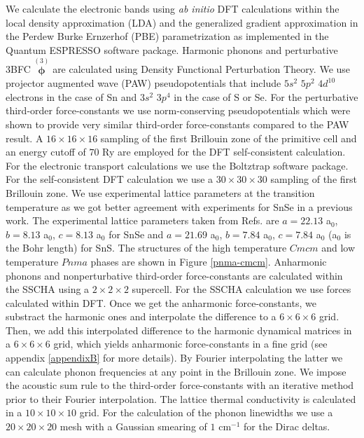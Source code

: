 We calculate the electronic bands using {\it ab initio} DFT calculations within the local density approximation (LDA)\cite{perdew1981self} and the generalized gradient approximation in the Perdew Burke
Ernzerhof (PBE) parametrization\cite{perdew1996generalized} as implemented in the {\sc Quantum ESPRESSO}\cite{giannozzi2009quantum} software package. Harmonic phonons and perturbative 3BFC $\overset{(3)}{\boldsymbol{\phi}}$ 
are calculated  using Density Functional Perturbation Theory\cite{baroni2001phonons,paulatto2013anharmonic}. We use projector augmented wave\cite{blochl1994projector} (PAW) pseudopotentials that 
include $5s^{2}$ $5p^{2}$ $4d^{10}$ electrons in the case of Sn and $3s^{2}$ $3p^{4}$ in the case of S or Se. For the perturbative third-order force-constants we use norm-conserving pseudopotentials which were 
shown\cite{aseginolaza2019phonon} to provide very similar third-order force-constants compared to the PAW result. A $16\times16\times16$ sampling of the first Brillouin zone of the primitive cell and an energy
cutoff of $70$ Ry are employed for the DFT self-consistent calculation. For the electronic transport calculations we use the Boltztrap software package\cite{madsen2006boltztrap}. For the self-consistent DFT calculation we 
use a $30\times30\times30$ sampling of the first Brillouin zone. We use experimental lattice parameters at the transition temperature as we got better agreement with experiments for SnSe in a previous
work\cite{aseginolaza2019phonon}. The experimental lattice parameters taken from Refs.\cite{adouby1998structure,chattopadhyay1986neutron} are $a=22.13$ a$_{0}$, $b=8.13$ a$_{0}$, $c=8.13$ a$_{0}$ for SnSe
and $a=21.69$ a$_{0}$, $b=7.84$ a$_{0}$, $c=7.84$ a$_{0}$ (a$_{0}$ is the Bohr length) for SnS. The structures of the high temperature $Cmcm$ and low temperature $Pnma$ phases are shown in Figure \ref{pnma-cmcm}.
Anharmonic phonons and nonperturbative third-order force-constants are calculated within the SSCHA using a $2\times2\times2$ supercell. For the SSCHA calculation we use forces calculated within DFT. Once we get the anharmonic
force-constants, we substract the harmonic ones and interpolate the difference to a $6\times6\times6$ grid. Then, we add this interpolated difference to the harmonic dynamical matrices in a $6\times6\times6$ grid, which yields
anharmonic force-constants in a fine grid (see appendix \ref{appendixB} for more details). By Fourier interpolating 
the latter we can calculate phonon frequencies at any point in the Brillouin zone. We impose the acoustic sum rule 
to the third-order force-constants with an iterative method prior to their Fourier 
interpolation\cite{paulatto2013anharmonic,aseginolaza2019phonon}. The lattice thermal conductivity is calculated in 
a $10\times10\times10$ grid. For the calculation of the phonon linewidths we use a $20\times20\times20$ mesh with a 
Gaussian smearing of $1$ cm$^{-1}$ for the Dirac deltas.

